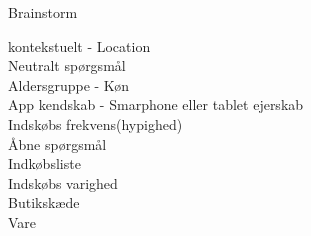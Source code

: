 \documentclass[12pt]{article}
\begin{document}
Brainstorm

  kontekstuelt - Location \\

  Neutralt sp\o rgsm\aa l \\

  Aldersgruppe - K\o n \\

  App kendskab - Smarphone eller tablet ejerskab \\ 

  Indsk\o bs frekvens(hypighed) \\

  \AA bne sp\o rgsm\aa l \\ 

  Indk\o bsliste \\
  
  Indsk\o bs varighed \\
  
  Butiksk\ae de \\

  Vare \\
    
\end{document}
